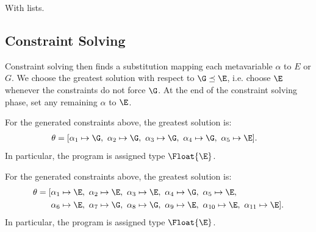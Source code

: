 \begin{example}
    With lists.
\end{example}

\subsection{Constraint Solving}
Constraint solving then finds a substitution mapping each metavariable $\alpha$ to $E$ or $G$. We choose the greatest solution with respect to $\G \preceq \E$, i.e. choose $\E$ whenever the constraints do not force $\G$. At the end of the constraint solving phase, set any remaining $\alpha$ to $\E$.

\begin{example}
  For the generated constraints above, the greatest solution is:
  \begin{align*}
    \theta = [&\alpha_1 \mapsto \G,\ \alpha_2 \mapsto \G,\ \alpha_3 \mapsto \G,\ \alpha_4 \mapsto \G,\ \alpha_5 \mapsto \E ].
  \end{align*}
  In particular, the program is assigned type $\Float{\E}$.
\end{example}

\begin{example}
  For the generated constraints above, the greatest solution is:
  \begin{align*}
    \theta = [&\alpha_1 \mapsto \E,\ \alpha_2 \mapsto \E,\ \alpha_3 \mapsto \E,\ \alpha_4 \mapsto \G,\ \alpha_5 \mapsto \E, \\
              &\alpha_6 \mapsto \E,\ \alpha_7 \mapsto \G,\ \alpha_8 \mapsto \G,\ \alpha_9 \mapsto \E,\ \alpha_{10} \mapsto \E,\ \alpha_{11} \mapsto \E ].
  \end{align*}
  In particular, the program is assigned type $\Float{\E}$.
\end{example}
